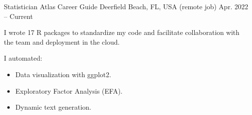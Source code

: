 


\begin{cventries}

\cventry
{Statistician} %
{Atlas Career Guide} %
{Deerfield Beach, FL, USA (remote job)} %
{Apr. 2022 -- Current} %
{%
\begin{cvitems}
\item {I wrote 17 R packages to standardize my code and facilitate collaboration with the team and deployment in the cloud.}
\item {I automated: \begin{itemize}[leftmargin = 0.25cm] \item{Data visualization with ggplot2.} \item{Exploratory Factor Analysis (EFA).} \item{Dynamic text generation.} \end{itemize}}

\end{cvitems}}
\end{cventries}
